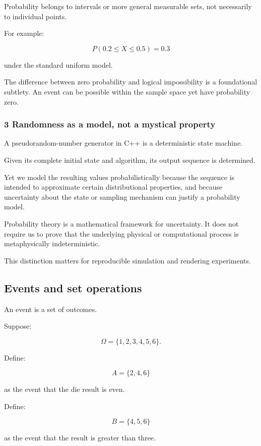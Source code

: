 Probability belongs to intervals or more general measurable sets, not necessarily to individual points.

For example:

\[
 P(0.2\le X\le0.5)=0.3
\]

under the standard uniform model.

The difference between zero probability and logical impossibility is a foundational subtlety. An event can be possible within the sample space yet have probability zero.

\subsubsection{3 Randomness as a model, not a mystical property}\label{02-foundations-ii-ch023-randomness-as-a-model-not-a-mystical-property}

A pseudorandom-number generator in C++ is a deterministic state machine.

Given its complete initial state and algorithm, its output sequence is determined.

Yet we model the resulting values probabilistically because the sequence is intended to approximate certain distributional properties, and because uncertainty about the state or sampling mechanism can justify a probability model.

Probability theory is a mathematical framework for uncertainty. It does not require us to prove that the underlying physical or computational process is metaphysically indeterministic.

This distinction matters for reproducible simulation and rendering experiments.

\subsection{Events and set operations}\label{02-foundations-ii-ch023-events-and-set-operations}

An event is a set of outcomes.

Suppose:

\[
 \Omega=\{1,2,3,4,5,6\}.
\]

Define:

\[
 A=\{2,4,6\}
\]

as the event that the die result is even.

Define:

\[
 B=\{4,5,6\}
\]

as the event that the result is greater than three.

